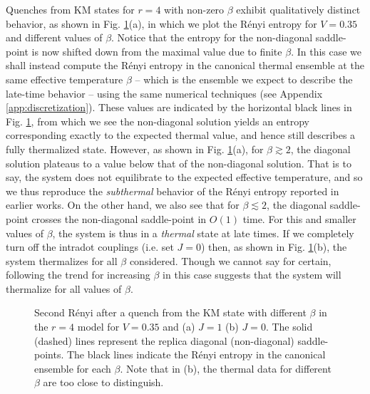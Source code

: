 \documentclass[reprint, floatfix,eqsecnum,superscriptaddress,preprint,nofootinbib,onecolumn,amsmath,amssymb,aps,prb]{revtex4-2}
\begin{document}
Quenches from KM states for $r=4$ with non-zero $\beta$ exhibit qualitatively distinct behavior, as shown in Fig. \ref{fig:r4-km-largeN}(a), in which we plot the R\'enyi entropy for $V=0.35$ and different values of $\beta$. %
Notice that the entropy for the non-diagonal saddle-point is now shifted down from the maximal value due to finite $\beta$. In this case we shall instead compute the R\'enyi entropy in the canonical thermal ensemble at the same effective temperature $\beta$ -- which is the ensemble we expect to describe the late-time behavior -- using the same numerical techniques \cite{Zhang2020a} (see Appendix \ref{app:discretization}). 
These values are indicated by the horizontal black lines in Fig. \ref{fig:r4-km-largeN}, from which we see the non-diagonal solution yields an entropy corresponding exactly to the expected thermal value, and hence still describes a fully thermalized state. However, as shown in Fig. \ref{fig:r4-km-largeN}(a), for $\beta \gtrsim  2$, the diagonal solution plateaus to a value below that of the non-diagonal solution. 
That is to say, the system does not equilibrate to the expected effective temperature, and so we thus reproduce the \emph{subthermal} behavior of the R\'enyi entropy reported in earlier works.
On the other hand, we also see that for $\beta \lesssim 2$, the diagonal saddle-point crosses the non-diagonal saddle-point in $O(1)$ time. For this and smaller values of $\beta$, the system is thus in a \emph{thermal} state at late times. If we completely turn off the intradot couplings (i.e. set $J=0$) then, as shown in Fig. \ref{fig:r4-km-largeN}(b), the system thermalizes for all $\beta$ considered. Though we cannot say for certain, following the trend for increasing $\beta$ in this case suggests that the system will thermalize for all values of $\beta$.

\begin{figure}%
  \caption{ Second R\'enyi after a quench from the KM state with different $\beta$ in the $r=4$ model for $V=0.35$ and (a) $J=1$ (b) $J=0$. The solid (dashed) lines represent the replica diagonal (non-diagonal) saddle-points. %
  The black lines indicate the R\'enyi entropy in the canonical ensemble for each $\beta$. Note that in (b), the thermal data for different $\beta$ are too close to distinguish. 
  } \label{fig:r4-km-largeN}
\end{figure}
\end{document}

